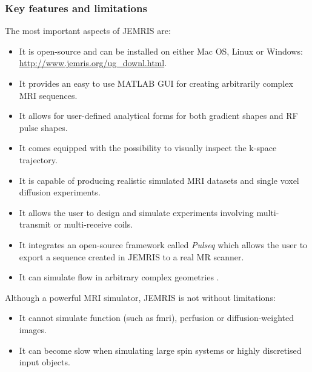 \subsubsection{Key features and limitations}
The most important aspects of JEMRIS are:
\begin{itemize}
    
    \item It is open-source and can be installed on either Mac OS, Linux or Windows: \url{http://www.jemris.org/ug_downl.html}.
    
    \item It provides an easy to use MATLAB GUI for creating arbitrarily complex MRI sequences.
    
    \item It allows for user-defined analytical forms for both gradient shapes and RF pulse shapes. 
    
    \item It comes equipped with the possibility to visually inspect the k-space trajectory.
    
    \item It is capable of producing realistic simulated MRI datasets and single voxel diffusion experiments.
    
    \item It allows the user to design and simulate experiments involving multi-transmit or multi-receive coils.
    
    \item It integrates an open-source framework called \textit{Pulseq} \cite{Layton2017} which allows the user to export a sequence created in JEMRIS to a real MR scanner.
    
    \item It can simulate flow in arbitrary complex geometries \cite{Fortin2016}.
    
\end{itemize}

\hfill

Although a powerful MRI simulator, JEMRIS is not without limitations:
\begin{itemize}
    
    \item It cannot simulate function (such as \ac{fmri}), perfusion or diffusion-weighted images.
    
    \item It can become slow when simulating large spin systems or highly discretised input objects. 
    
\end{itemize}

